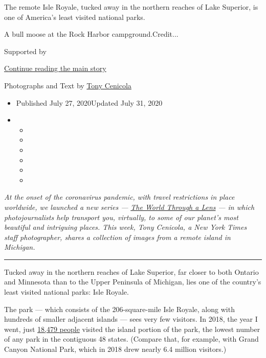 The remote Isle Royale, tucked away in the northern reaches of Lake
Superior, is one of America's least visited national parks.

A bull moose at the Rock Harbor campground.Credit...

Supported by

\protect\hyperlink{after-sponsor}{Continue reading the main story}

Photographs and Text by
\href{https://www.nytimes.com/by/tony-cenicola}{Tony Cenicola}

\begin{itemize}
\item
  Published July 27, 2020Updated July 31, 2020
\item
  \begin{itemize}
  \item
  \item
  \item
  \item
  \item
  \item
  \end{itemize}
\end{itemize}

\emph{At the onset of the coronavirus pandemic, with travel restrictions
in place worldwide, we launched a new series ---}
\href{https://www.nytimes.com/column/the-world-through-a-lens}{\emph{The
World Through a Lens}} \emph{--- in which photojournalists help
transport you, virtually, to some of our planet's most beautiful and
intriguing places. This week, Tony Cenicola, a New York Times staff
photographer, shares a collection of images from a remote island in
Michigan.}

\begin{center}\rule{0.5\linewidth}{\linethickness}\end{center}

Tucked away in the northern reaches of Lake Superior, far closer to both
Ontario and Minnesota than to the Upper Peninsula of Michigan, lies one
of the country's least visited national parks: Isle Royale.

The park --- which consists of the 206-square-mile Isle Royale, along
with hundreds of smaller adjacent islands --- sees very few visitors. In
2018, the year I went, just
\href{https://www.nps.gov/isro/learn/management/statistics.htm}{18,479
people} visited the island portion of the park, the lowest number of any
park in the contiguous 48 states. (Compare that, for example, with Grand
Canyon National Park, which in 2018 drew nearly 6.4 million visitors.)

